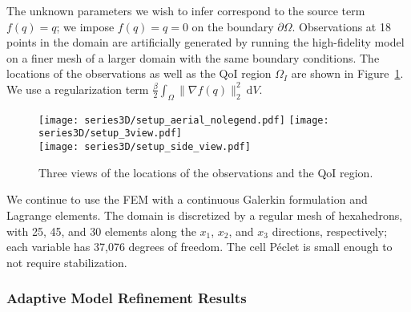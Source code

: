 The unknown parameters we wish to infer correspond to the source term $f(q)=q$; we impose $f(q)=q=0$ on the boundary $\partial\Omega$. Observations at 18 points in the domain are artificially generated by running the high-fidelity model on a finer mesh of a larger domain with the same boundary conditions. The locations of the observations as well as the QoI region $\Omega_I$ are shown in Figure~\ref{fig:setup3D}. We use a regularization term $\frac{\beta}{2}\int_\Omega \|\nabla f(q)\|_2^2\:\textrm{d}V$.
%
\begin{figure}[h]
\centering
\texttt{[image: series3D/setup\_aerial\_nolegend.pdf]} \hfill
\texttt{[image: series3D/setup\_3view.pdf]} \\ 
\vspace{\baselineskip}
\texttt{[image: series3D/setup\_side\_view.pdf]}
\caption{Three views of the locations of the observations and the QoI region.}
\label{fig:setup3D}
\end{figure}
%
We continue to use the FEM with a continuous Galerkin formulation and Lagrange elements. The domain is discretized by a regular mesh of hexahedrons, with 25, 45, and 30 elements along the $x_1$, $x_2$, and $x_3$ directions, respectively; each variable has 37,076 degrees of freedom. The cell P\'{e}clet is small enough to not require stabilization.

\subsubsection{Adaptive Model Refinement Results} \label{sec:ref3D}

